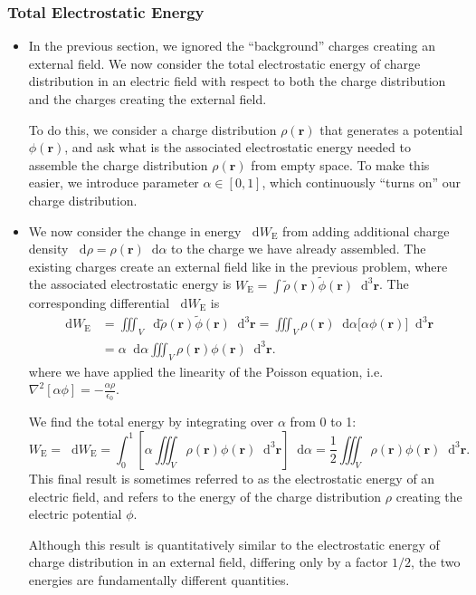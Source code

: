\documentclass[11pt, a4paper]{article}
\newcommand{\diff}{\mathop{}\!\mathrm{d}} %
\newcommand{\dr}{\diff^{3} \r}  %
\renewcommand{\vec}[1]{\bm{#1}} %
\renewcommand{\t}[1]{\tilde{#1}} %
\renewcommand{\r}{\vec{r}}
\newcommand{\ee}{\epsilon_{0}}  %
\renewcommand{\laplacian}{\nabla^{2}}
\begin{document}
\subsubsection{Total Electrostatic Energy}
\begin{itemize}
	\item In the previous section, we ignored the  ``background'' charges creating an external field. We now consider the total electrostatic energy of charge distribution in an electric field with respect to both the charge distribution and the charges creating the external field. 
	
	To do this, we consider a charge distribution $ \rho(\r) $ that generates a potential $ \phi(\r) $, and ask what is the associated electrostatic energy needed to assemble the charge distribution $ \rho(\r) $ from empty space. To make this easier, we introduce parameter $ \alpha \in [0, 1] $, which continuously ``turns on'' our charge distribution. 
	
	\item We now consider the change in energy $ \diff W_{\text{E}} $ from adding additional charge density $ \diff \rho = \rho(\r) \diff \alpha $ to the charge we have already assembled. The existing charges create an external field like in the previous problem, where the associated electrostatic energy is $ W_{\text{E}} = \int \t{\rho}(\r) \t{\phi} (\r) \dr $. 	The corresponding differential $ \diff W_{\text{E}} $ is
	\begin{align*}
		\diff W_{\text{E}} &= \iiint_{V} \diff \t{\rho}(\r)\t{\phi}(\r) \dr = \iiint_{V} \rho(\r) \diff\alpha \big[\alpha \phi (\r)\big ] \dr \\
		& = \alpha \diff \alpha \iiint_{V} \rho(\r) \phi(\r) \dr.
	\end{align*}
	where we have applied the linearity of the Poisson equation, i.e. $ \laplacian [\alpha \phi] = - \frac{\alpha \rho }{\ee} $. 
	
	We find the total energy by integrating over $ \alpha $ from 0 to 1:
	\begin{equation*}
		W_{\text{E}} = \diff W_{\text{E}} = \int_{0}^{1} \left[ \alpha \iiint_{V} \rho(\r) \phi(\r) \dr \right] \diff \alpha = \frac{1}{2} \iiint_{V} \rho(\r) \phi(\r) \dr.
	\end{equation*}
	This final result is sometimes referred to as the electrostatic energy of an electric field, and refers to the energy of the charge distribution $ \rho $ creating the electric potential $ \phi $.
	
	Although this result is quantitatively similar to the electrostatic energy of charge distribution in an external field, differing only by a factor $ 1/2 $, the two energies are fundamentally different quantities. 
	

\end{itemize}
\end{document}
